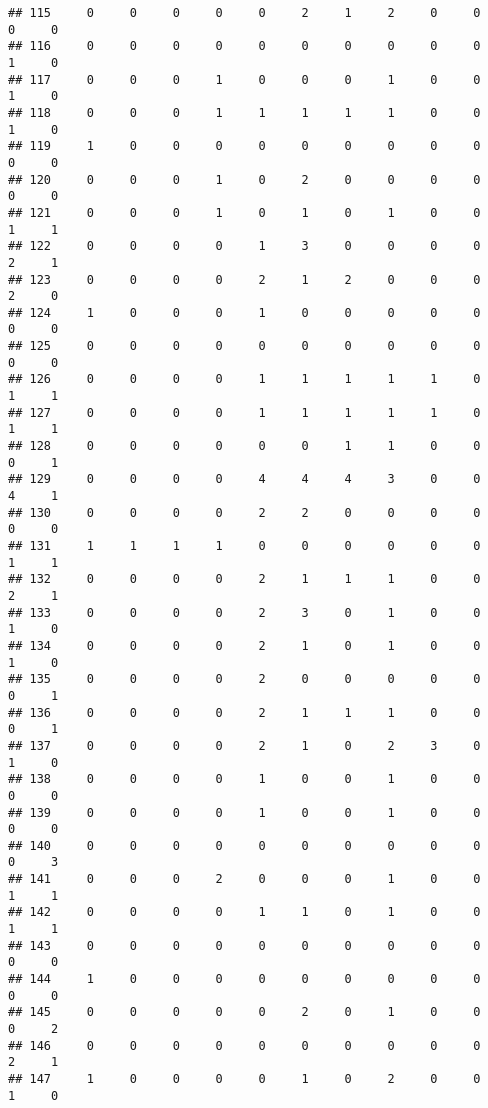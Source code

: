 \documentclass[
]{article}
\begin{document}
\begin{verbatim}
## 115     0     0     0     0     0     2     1     2     0     0     0     0
## 116     0     0     0     0     0     0     0     0     0     0     1     0
## 117     0     0     0     1     0     0     0     1     0     0     1     0
## 118     0     0     0     1     1     1     1     1     0     0     1     0
## 119     1     0     0     0     0     0     0     0     0     0     0     0
## 120     0     0     0     1     0     2     0     0     0     0     0     0
## 121     0     0     0     1     0     1     0     1     0     0     1     1
## 122     0     0     0     0     1     3     0     0     0     0     2     1
## 123     0     0     0     0     2     1     2     0     0     0     2     0
## 124     1     0     0     0     1     0     0     0     0     0     0     0
## 125     0     0     0     0     0     0     0     0     0     0     0     0
## 126     0     0     0     0     1     1     1     1     1     0     1     1
## 127     0     0     0     0     1     1     1     1     1     0     1     1
## 128     0     0     0     0     0     0     1     1     0     0     0     1
## 129     0     0     0     0     4     4     4     3     0     0     4     1
## 130     0     0     0     0     2     2     0     0     0     0     0     0
## 131     1     1     1     1     0     0     0     0     0     0     1     1
## 132     0     0     0     0     2     1     1     1     0     0     2     1
## 133     0     0     0     0     2     3     0     1     0     0     1     0
## 134     0     0     0     0     2     1     0     1     0     0     1     0
## 135     0     0     0     0     2     0     0     0     0     0     0     1
## 136     0     0     0     0     2     1     1     1     0     0     0     1
## 137     0     0     0     0     2     1     0     2     3     0     1     0
## 138     0     0     0     0     1     0     0     1     0     0     0     0
## 139     0     0     0     0     1     0     0     1     0     0     0     0
## 140     0     0     0     0     0     0     0     0     0     0     0     3
## 141     0     0     0     2     0     0     0     1     0     0     1     1
## 142     0     0     0     0     1     1     0     1     0     0     1     1
## 143     0     0     0     0     0     0     0     0     0     0     0     0
## 144     1     0     0     0     0     0     0     0     0     0     0     0
## 145     0     0     0     0     0     2     0     1     0     0     0     2
## 146     0     0     0     0     0     0     0     0     0     0     2     1
## 147     1     0     0     0     0     1     0     2     0     0     1     0

\end{verbatim}
\end{document}
